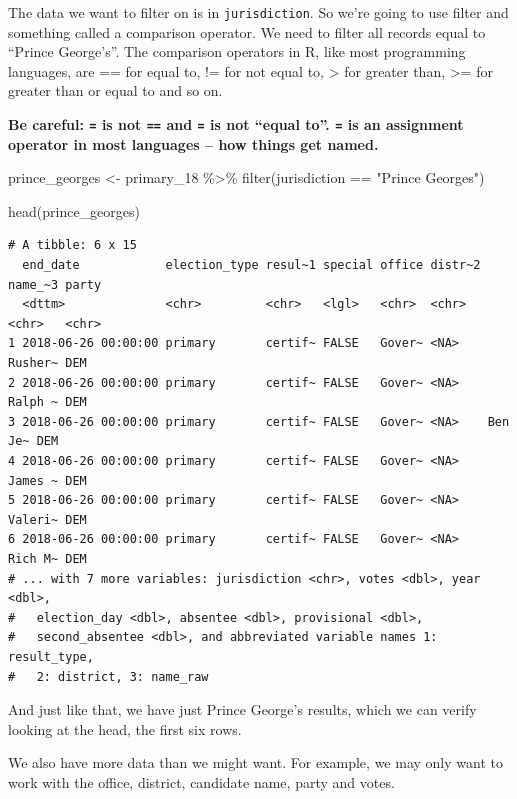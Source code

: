 \documentclass[
  letterpaper,
  DIV=11,
  numbers=noendperiod]{scrreprt}
\newenvironment{Shaded}{\begin{snugshade}}{\end{snugshade}}
\newcommand{\FunctionTok}[1]{\textcolor[rgb]{0.28,0.35,0.67}{#1}}
\newcommand{\NormalTok}[1]{\textcolor[rgb]{0.00,0.23,0.31}{#1}}
\newcommand{\OtherTok}[1]{\textcolor[rgb]{0.00,0.23,0.31}{#1}}
\newcommand{\SpecialCharTok}[1]{\textcolor[rgb]{0.37,0.37,0.37}{#1}}
\newcommand{\StringTok}[1]{\textcolor[rgb]{0.13,0.47,0.30}{#1}}
\begin{document}
The data we want to filter on is in \texttt{jurisdiction}. So we're
going to use filter and something called a comparison operator. We need
to filter all records equal to ``Prince George's''. The comparison
operators in R, like most programming languages, are == for equal to, !=
for not equal to, \textgreater{} for greater than, \textgreater= for
greater than or equal to and so on.

\textbf{Be careful: \texttt{=} is not \texttt{==} and \texttt{=} is not
``equal to''. \texttt{=} is an assignment operator in most languages --
how things get named.}

\begin{Shaded}
\begin{Highlighting}[]
\NormalTok{prince\_georges }\OtherTok{\textless{}{-}}\NormalTok{ primary\_18 }\SpecialCharTok{\%\textgreater{}\%} \FunctionTok{filter}\NormalTok{(jurisdiction }\SpecialCharTok{==} \StringTok{"Prince George\textquotesingle{}s"}\NormalTok{)}

\FunctionTok{head}\NormalTok{(prince\_georges)}
\end{Highlighting}
\end{Shaded}

\begin{verbatim}
# A tibble: 6 x 15
  end_date            election_type resul~1 special office distr~2 name_~3 party
  <dttm>              <chr>         <chr>   <lgl>   <chr>  <chr>   <chr>   <chr>
1 2018-06-26 00:00:00 primary       certif~ FALSE   Gover~ <NA>    Rusher~ DEM  
2 2018-06-26 00:00:00 primary       certif~ FALSE   Gover~ <NA>    Ralph ~ DEM  
3 2018-06-26 00:00:00 primary       certif~ FALSE   Gover~ <NA>    Ben Je~ DEM  
4 2018-06-26 00:00:00 primary       certif~ FALSE   Gover~ <NA>    James ~ DEM  
5 2018-06-26 00:00:00 primary       certif~ FALSE   Gover~ <NA>    Valeri~ DEM  
6 2018-06-26 00:00:00 primary       certif~ FALSE   Gover~ <NA>    Rich M~ DEM  
# ... with 7 more variables: jurisdiction <chr>, votes <dbl>, year <dbl>,
#   election_day <dbl>, absentee <dbl>, provisional <dbl>,
#   second_absentee <dbl>, and abbreviated variable names 1: result_type,
#   2: district, 3: name_raw
\end{verbatim}

And just like that, we have just Prince George's results, which we can
verify looking at the head, the first six rows.

We also have more data than we might want. For example, we may only want
to work with the office, district, candidate name, party and votes.
\end{document}
